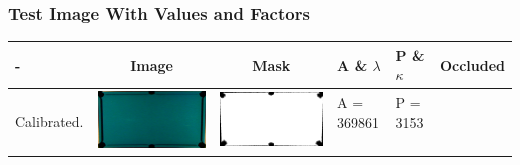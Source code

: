 \subsubsection{Test Image With Values and Factors}
\begin{tabular}{|l|c|c|l|l|c|}

\hline - & Image & Mask & A \& $\lambda$ & P \& $\kappa$ & Occluded \\ 
\hline

\multirow{4}{*}{Calibrated.} & \multirow{4}{*}{\includegraphics[scale=0.08]{../images/1/calibimg.png}} & \multirow{4}{*}{\includegraphics[scale=0.08]{../images/1/calibmask.png}} & A = 369861 & P = 3153  & \multirow{4}{*}{}\\  
& & & & & \\
&&&&&\\
&&&&&\\
\hline


\end{tabular}
